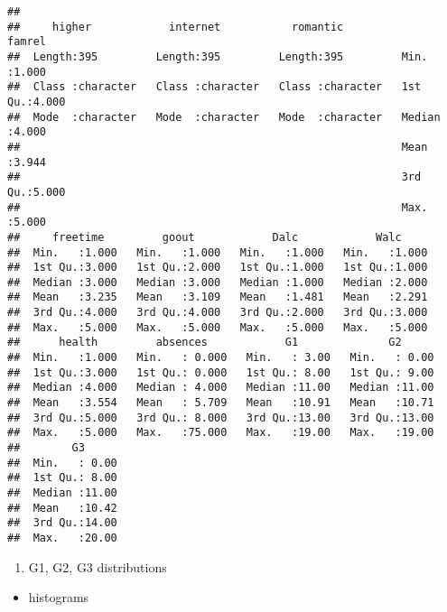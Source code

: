\documentclass[
]{article}
\providecommand{\tightlist}{%
  \setlength{\itemsep}{0pt}\setlength{\parskip}{0pt}}
\begin{document}
\begin{verbatim}
##                                                                             
##     higher            internet           romantic             famrel     
##  Length:395         Length:395         Length:395         Min.   :1.000  
##  Class :character   Class :character   Class :character   1st Qu.:4.000  
##  Mode  :character   Mode  :character   Mode  :character   Median :4.000  
##                                                           Mean   :3.944  
##                                                           3rd Qu.:5.000  
##                                                           Max.   :5.000  
##     freetime         goout            Dalc            Walc      
##  Min.   :1.000   Min.   :1.000   Min.   :1.000   Min.   :1.000  
##  1st Qu.:3.000   1st Qu.:2.000   1st Qu.:1.000   1st Qu.:1.000  
##  Median :3.000   Median :3.000   Median :1.000   Median :2.000  
##  Mean   :3.235   Mean   :3.109   Mean   :1.481   Mean   :2.291  
##  3rd Qu.:4.000   3rd Qu.:4.000   3rd Qu.:2.000   3rd Qu.:3.000  
##  Max.   :5.000   Max.   :5.000   Max.   :5.000   Max.   :5.000  
##      health         absences            G1              G2       
##  Min.   :1.000   Min.   : 0.000   Min.   : 3.00   Min.   : 0.00  
##  1st Qu.:3.000   1st Qu.: 0.000   1st Qu.: 8.00   1st Qu.: 9.00  
##  Median :4.000   Median : 4.000   Median :11.00   Median :11.00  
##  Mean   :3.554   Mean   : 5.709   Mean   :10.91   Mean   :10.71  
##  3rd Qu.:5.000   3rd Qu.: 8.000   3rd Qu.:13.00   3rd Qu.:13.00  
##  Max.   :5.000   Max.   :75.000   Max.   :19.00   Max.   :19.00  
##        G3       
##  Min.   : 0.00  
##  1st Qu.: 8.00  
##  Median :11.00  
##  Mean   :10.42  
##  3rd Qu.:14.00  
##  Max.   :20.00
\end{verbatim}

\begin{enumerate}
\def\labelenumi{\alph{enumi}.}
\tightlist
\item
  G1, G2, G3 distributions
\end{enumerate}

\begin{itemize}
\tightlist
\item
  histograms
\end{itemize}
\end{document}
